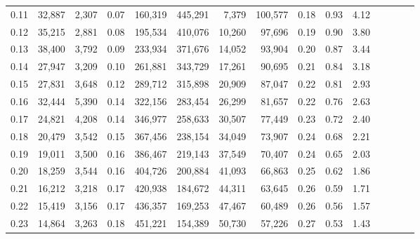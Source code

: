 \begin{tabular}{rrrcrrrrrrrrrrr}
0.11 &  32,887 &  2,307 &                                       0.07 &  160,319 &  445,291 &    7,379 &  100,577 &  0.18 &  0.93 &                         4.12 \\
0.12 &  35,215 &  2,881 &                                       0.08 &  195,534 &  410,076 &   10,260 &   97,696 &  0.19 &  0.90 &                         3.80 \\
0.13 &  38,400 &  3,792 &                                       0.09 &  233,934 &  371,676 &   14,052 &   93,904 &  0.20 &  0.87 &                         3.44 \\
0.14 &  27,947 &  3,209 &                                       0.10 &  261,881 &  343,729 &   17,261 &   90,695 &  0.21 &  0.84 &                         3.18 \\
0.15 &  27,831 &  3,648 &                                       0.12 &  289,712 &  315,898 &   20,909 &   87,047 &  0.22 &  0.81 &                         2.93 \\
0.16 &  32,444 &  5,390 &                                       0.14 &  322,156 &  283,454 &   26,299 &   81,657 &  0.22 &  0.76 &                         2.63 \\
0.17 &  24,821 &  4,208 &                                       0.14 &  346,977 &  258,633 &   30,507 &   77,449 &  0.23 &  0.72 &                         2.40 \\
0.18 &  20,479 &  3,542 &                                       0.15 &  367,456 &  238,154 &   34,049 &   73,907 &  0.24 &  0.68 &                         2.21 \\
0.19 &  19,011 &  3,500 &                                       0.16 &  386,467 &  219,143 &   37,549 &   70,407 &  0.24 &  0.65 &                         2.03 \\
0.20 &  18,259 &  3,544 &                                       0.16 &  404,726 &  200,884 &   41,093 &   66,863 &  0.25 &  0.62 &                         1.86 \\
0.21 &  16,212 &  3,218 &                                       0.17 &  420,938 &  184,672 &   44,311 &   63,645 &  0.26 &  0.59 &                         1.71 \\
0.22 &  15,419 &  3,156 &                                       0.17 &  436,357 &  169,253 &   47,467 &   60,489 &  0.26 &  0.56 &                         1.57 \\
0.23 &  14,864 &  3,263 &                                       0.18 &  451,221 &  154,389 &   50,730 &   57,226 &  0.27 &  0.53 &                         1.43 \\

\end{tabular}
